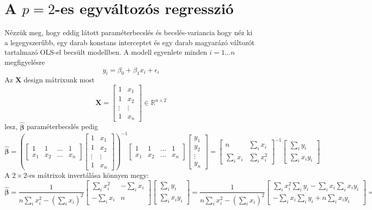 \documentclass[14p]{report}
\def\pmb{\boldsymbol}
\def\ebeta{\hat{\pmb{\beta}}}
\def\e{\epsilon}
\begin{document}
	\section{A $p=2$-es egyváltozós regresszió}
	Nézzük meg, hogy eddig látott paraméterbecslés és becslés-variancia hogy néz ki a legegyszerűbb, egy darab konstans interceptet és egy darab magyarázó változót tartalmazó OLS-el becsült modellben. A modell egyenlete minden $i = 1 \dots n$ megfigyelésre
	\[
	y_i = \beta_0 + \beta_1 x_i + \e_i
	\]
	Az $\pmb{X}$ design mátrixunk most
	\[
	\pmb{X}=
	\begin{bmatrix}
		1 & x_1 \\
		1 & x_2 \\
		\vdots & \vdots \\
		1 & x_n
	\end{bmatrix} \in \mathbb{R}^{n \times 2}
	\]
	lesz, $\ebeta$ paraméterbecslés pedig
	\[
	\ebeta = 
	\left(\begin{bmatrix}
		1 & 1 & \dots & 1 \\
		x_1 & x_2 & \dots & x_n
	\end{bmatrix}
	\begin{bmatrix}
		1 & x_1 \\
		1 & x_2 \\
		\vdots & \vdots \\
		1 & x_n
	\end{bmatrix}\right)^{-1}
	\begin{bmatrix}
		1 & 1 & \dots & 1 \\
		x_1 & x_2 & \dots & x_n
	\end{bmatrix}
	\begin{bmatrix}
		y_1 \\
		y_2 \\
		\vdots \\
		y_n
	\end{bmatrix}
	=
	\begin{bmatrix}
		n & \sum_i{x_i} \\
		\sum_i{x_i} & \sum_i{x_i^2}
	\end{bmatrix}^{-1}
	\begin{bmatrix}
		\sum_i{y_i} \\
		\sum_i{x_i y_i}
	\end{bmatrix}
	\]
	A $2 \times 2$-es mátrixok invertálása könnyen megy:
	\[
	\ebeta = 
	\frac{1}{n\sum_i{x_i^2} - (\sum_i{x_i})^2}
	\begin{bmatrix}
		\sum_i{x_i^2} & -\sum_i{x_i} \\
		-\sum_i{x_i} & n 
	\end{bmatrix}
	\begin{bmatrix}
		\sum_i{y_i} \\
		\sum_i{x_i y_i}
	\end{bmatrix}
	=
	\frac{1}{n\sum_i{x_i^2} - (\sum_i{x_i})^2}
	\begin{bmatrix}
		\sum_i{x_i^2}\sum_i{y_i} - \sum_i{x_i}\sum_i{x_i y_i} \\
		-\sum_i{x_i}\sum_i{y_i} + n\sum_i{x_i y_i}
	\end{bmatrix}
	=
	\]
\end{document}
